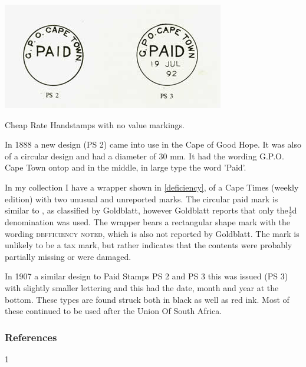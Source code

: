 \begin{marginfigure}
\centering
\includegraphics[width=.95\textwidth]{../cape-of-good-hope/cheap-rate-mail/paid-stamps.jpg}
\caption{Cheap Rate Handstamps with no value markings.} 
\end{marginfigure}

In 1888 a new design (PS 2) came into use in the Cape of Good Hope. 
It was also of a circular design and had a diameter of 30 mm. 
It had the wording G.P.O. Cape Town ontop and in the middle, 
in large type the word 'Paid'.



In my collection I have a wrapper shown in \ref{deficiency}, of a  Cape Times (weekly edition) with two unusual and unreported marks. The circular paid mark is similar to , as classified by Goldblatt, however Goldblatt reports that only the$\frac{1}{2}$d denomination was used. The wrapper bears a rectangular shape mark with the wording \textsc{defficiency noted}, which is also not reported by Goldblatt. The mark is unlikely to be a tax mark, but rather indicates that the contents were probably partially missing or were damaged.

In 1907 a similar design to Paid 
Stamps PS 2 and PS 3 this was issued (PS 3) with slightly smaller 
lettering and this had the date, month and year at the bottom. 
These types are found struck both in black as well as red ink. Most of these continued  to be used after the Union Of South Africa.

\subsubsection{References}


1  


                                                        